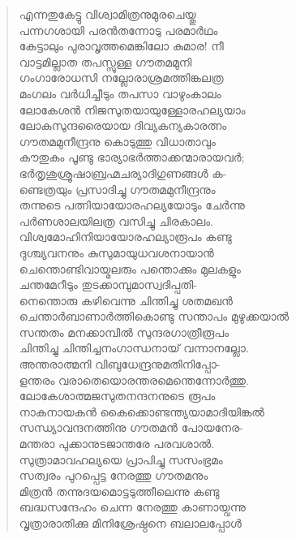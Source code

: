 \begin{verse}
എന്നതുകേട്ടു വിശ്വാമിത്രനുമുരചെയ്തു\\
പന്നഗശായി പരന്‍തന്നോടു പരമാര്‍ഥം\\
കേട്ടാലും പുരാവൃത്തമെങ്കിലോ കുമാര! നീ\\
വാട്ടമില്ലാത തപസ്സുള്ള ഗൗതമമുനി\\
ഗംഗാരോധസി നല്ലോരാശ്രമത്തിങ്കലത്ര\\
മംഗലം വര്‍ധിച്ചീടും തപസാ വാഴുംകാലം\\
ലോകേശന്‍ നിജസുതയായുള്ളോരഹല്യയാം\\
ലോകസുന്ദരൈയായ ദിവ്യകന്യകാരത്നം\\
ഗൗതമമുനീന്ദ്രനു കൊടുത്തു വിധാതാവും\\
കൗതുകം പൂണ്ടു ഭാര്യാഭര്‍ത്താക്കന്മാരായവര്‍;\\
ഭര്‍തൃശുശ്രൂഷാബ്രഹ്മചര്യാദിഗുണങ്ങള്‍ ക-\\
ണ്ടെത്രയും പ്രസാദിച്ചു ഗൗതമമുനീന്ദ്രനും\\
തന്നുടെ പത്നിയായോരഹല്യയോടും ചേര്‍ന്നു\\
പര്‍ണശാലയിലത്ര വസിച്ചു ചിരകാലം.\\
വിശ്വമോഹിനിയായോരഹല്യാരൂപം കണ്ടു\\
ദുശ്ച്യവനനും കുസുമായുധവശനായാന്‍\\
ചെന്തൊണ്ടിവായ്മലരും പന്തൊക്കും മുലകളും\\
ചന്തമേറീടും തുടക്കാമ്പുമാസ്വദിപ്പതി-\\
നെന്തൊരു കഴിവെന്നു ചിന്തിച്ചു ശതമഖന്‍\\
ചെന്താര്‍ബാണാര്‍ത്തികൊണ്ടു സന്താപം മുഴുക്കയാല്‍\\
സന്തതം മനക്കാമ്പില്‍ സുന്ദരഗാത്രീരൂപം\\
ചിന്തിച്ചു ചിന്തിച്ചനംഗാന്ധനായ് വന്നാനല്ലോ.\\
അന്തരാത്മനി വിബുധേന്ദ്രനുമതിനിപ്പോ-\\
ളന്തരം വരാതെയൊരന്തരമെന്തെന്നോര്‍ത്തു.\\
ലോകേശാത്മജസുതനന്ദനനുടെ രൂപം\\
നാകനായകന്‍ കൈക്കൊണ്ടന്ത്യയാമാദിയിങ്കല്‍\\
സന്ധ്യാവന്ദനത്തിനു ഗൗതമന്‍ പോയനേര-\\
മന്തരാ പുക്കാനുടജാന്തരേ പരവശാല്‍.\\
സുത്രാമാവഹല്യയെ പ്രാപിച്ചു സസംഭ്രമം\\
സത്വരം പുറപ്പെട്ട നേരത്തു ഗൗതമനും\\
മിത്രന്‍ തന്നുദയമൊട്ടടുത്തീലെന്നു കണ്ടു\\
ബദ്ധസന്ദേഹം ചെന്ന നേരത്തു കാണായ്വന്നു\\
വൃത്രാരാതിക്കു മിനിശ്രേഷ്ഠനെ ബലാലപ്പോള്‍\\

\end{verse}
